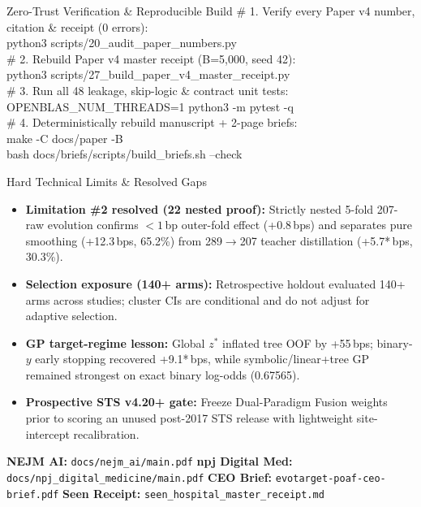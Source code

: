 \documentclass[8.5pt,letterpaper]{article}
\begin{document}
\begin{minipage}[t]{0.486\textwidth}
  \vspace{0pt}
  \begin{codecard}{Zero-Trust Verification \& Reproducible Build}
{\color{codecomment}\# 1. Verify every Paper v4 number, citation \& receipt (0 errors):}\\
python3 scripts/20\_audit\_paper\_numbers.py\\[2.2pt]
{\color{codecomment}\# 2. Rebuild Paper v4 master receipt (B=5,000, seed 42):}\\
python3 scripts/27\_build\_paper\_v4\_master\_receipt.py\\[2.2pt]
{\color{codecomment}\# 3. Run all 48 leakage, skip-logic \& contract unit tests:}\\
OPENBLAS\_NUM\_THREADS=1 python3 -m pytest -q\\[2.2pt]
{\color{codecomment}\# 4. Deterministically rebuild manuscript + 2-page briefs:}\\
make -C docs/paper -B\\
bash docs/briefs/scripts/build\_briefs.sh --check
  \end{codecard}

  \vspace{2pt}
  \begin{govbox}{Hard Technical Limits \& Resolved Gaps}
    \begin{itemize}[leftmargin=1.10em,itemsep=1.4pt,topsep=1.2pt]
      \item \textbf{Limitation \#2 resolved (2\x{}2 nested proof):} Strictly nested 5-fold 207-raw evolution confirms $<1$\,bp outer-fold effect (+0.8\,bps) and separates pure smoothing (+12.3\,bps, 65.2\%) from 289$\to$207 teacher distillation (+5.7*\,bps, 30.3\%).
      \item \textbf{Selection exposure (140+ arms):} Retrospective holdout evaluated 140+ arms across studies; cluster CIs are conditional and do not adjust for adaptive selection.
      \item \textbf{GP target-regime lesson:} Global $z^*$ inflated tree OOF by +55\,bps; binary-$y$ early stopping recovered +9.1*\,bps, while symbolic/linear+tree GP remained strongest on exact binary log-odds (0.67565).
      \item \textbf{Prospective STS v4.20+ gate:} Freeze Dual-Paradigm Fusion weights prior to scoring an unused post-2017 STS release with lightweight site-intercept recalibration.
    \end{itemize}
  \end{govbox}
\end{minipage}

%
  {\textbf{NEJM AI:} \texttt{docs/nejm\_ai/main.pdf} \;\textbar\; \textbf{npj Digital Med:} \texttt{docs/npj\_digital\_medicine/main.pdf} \;\textbar\; \textbf{CEO Brief:} \texttt{evotarget-poaf-ceo-brief.pdf} \;\textbar\; \textbf{Seen Receipt:} \texttt{seen\_hospital\_master\_receipt.md}}%
  {\repourl}
\end{document}
